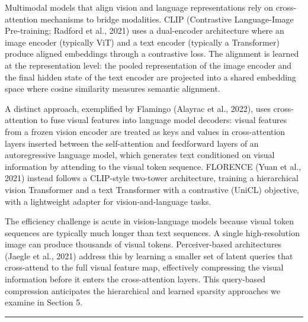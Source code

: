\documentclass[10pt,twocolumn]{article}
\begin{document}
Multimodal models that align vision and language representations rely on cross-attention mechanisms to bridge modalities. CLIP (Contrastive Language-Image Pre-training; Radford et al., 2021) uses a dual-encoder architecture where an image encoder (typically ViT) and a text encoder (typically a Transformer) produce aligned embeddings through a contrastive loss. The alignment is learned at the representation level: the pooled representation of the image encoder and the final hidden state of the text encoder are projected into a shared embedding space where cosine similarity measures semantic alignment.

A distinct approach, exemplified by Flamingo (Alayrac et al., 2022), uses cross-attention to fuse visual features into language model decoders: visual features from a frozen vision encoder are treated as keys and values in cross-attention layers inserted between the self-attention and feedforward layers of an autoregressive language model, which generates text conditioned on visual information by attending to the visual token sequence. FLORENCE (Yuan et al., 2021) instead follows a CLIP-style two-tower architecture, training a hierarchical vision Transformer and a text Transformer with a contrastive (UniCL) objective, with a lightweight adapter for vision-and-language tasks.

The efficiency challenge is acute in vision-language models because visual token sequences are typically much longer than text sequences. A single high-resolution image can produce thousands of visual tokens. Perceiver-based architectures (Jaegle et al., 2021) address this by learning a smaller set of latent queries that cross-attend to the full visual feature map, effectively compressing the visual information before it enters the cross-attention layers. This query-based compression anticipates the hierarchical and learned sparsity approaches we examine in Section 5.

\begin{center}\rule{0.5\linewidth}{0.5pt}\end{center}
\end{document}
